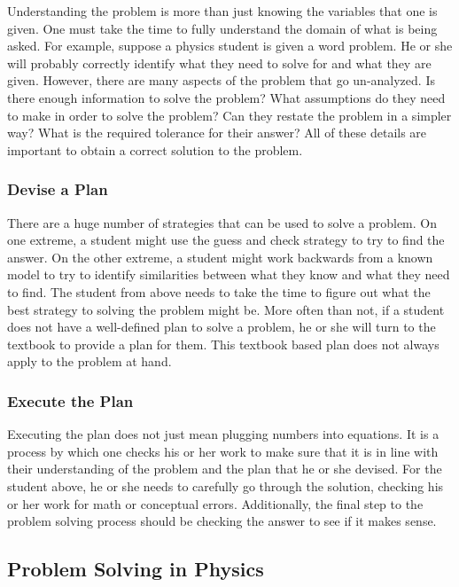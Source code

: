 Understanding the problem is more than just knowing the variables that one is given. One must take the time to fully understand the domain of what is being asked. For example, suppose a physics student is given a word problem. He or she will probably correctly identify what they need to solve for and what they are given. However, there are many aspects of the problem that go un-analyzed. Is there enough information to solve the problem? What assumptions do they need to make in order to solve the problem? Can they restate the problem in a simpler way? What is the required tolerance for their answer? All of these details are important to obtain a correct solution to the problem.

\subsubsection{Devise a Plan}

There are a huge number of strategies that can be used to solve a problem. On one extreme, a student might use the guess and check strategy to try to find the answer. On the other extreme, a student might work backwards from a known model to try to identify similarities between what they know and what they need to find. The student from above needs to take the time to figure out what the best strategy to solving the problem might be. More often than not, if a student does not have a well-defined plan to solve a problem, he or she will turn to the textbook to provide a plan for them. This textbook based plan does not always apply to the problem at hand.

\subsubsection{Execute the Plan}

Executing the plan does not just mean plugging numbers into equations. It is a process by which one checks his or her work to make sure that it is in line with their understanding of the problem and the plan that he or she devised. For the student above, he or she needs to carefully go through the solution, checking his or her work for math or conceptual errors. Additionally, the final step to the problem solving process should be checking the answer to see if it makes sense.

\subsection{Problem Solving in Physics}

